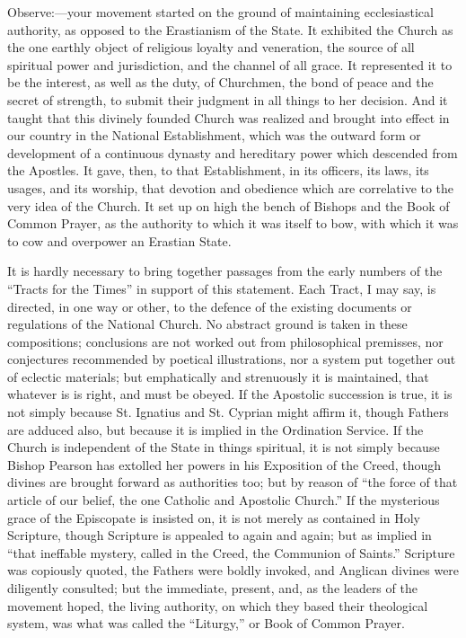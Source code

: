 Observe:—your movement started on the ground of maintaining
ecclesiastical authority, as opposed to the Erastianism of the State.
It exhibited the Church as the one earthly object of religious loyalty
and veneration, the source of all spiritual power and jurisdiction,
and the channel of all grace. It represented it to be the interest, as
well as the duty, of Churchmen, the bond of peace and the secret of
strength, to submit their judgment in all things to her decision. And
it taught that this divinely founded Church was realized and brought
into effect in our country in the National Establishment, which was
the outward form or development of a continuous dynasty and hereditary
power which descended from the Apostles. It gave, then, to that
Establishment, in its officers, its laws, its usages, and its worship,
that devotion and obedience which are correlative to the very idea of
the Church. It set up on high the bench of Bishops and the Book of
Common Prayer, as the authority to which it was itself to bow, with
which it was to cow and overpower an Erastian State.

It is hardly necessary to bring together passages from the early
numbers of the ``Tracts for the Times'' in support of this
statement. Each Tract, I may say, is directed, in one way or other, to
the defence of the existing documents or regulations of the National
Church. No abstract ground is taken in these compositions; conclusions
are not worked out from philosophical premisses, nor conjectures
recommended by poetical illustrations, nor a system put together out
of eclectic materials; but emphatically and strenuously it is
maintained, that whatever is is right, and must be obeyed. If the
Apostolic succession is true, it is not simply because St. Ignatius
and St. Cyprian might affirm it, though Fathers are adduced also, but
because it is implied in the Ordination Service. If the Church is
independent of the State in things spiritual, it is not simply because
Bishop Pearson has extolled her powers in his Exposition of the Creed,
though divines are brought forward as authorities too; but by reason
of ``the force of that article of our belief, the one Catholic and
Apostolic Church.'' If the mysterious grace of the Episcopate is
insisted on, it is not merely as contained in Holy Scripture, though
Scripture is appealed to again and again; but as implied in ``that
ineffable mystery, called in the Creed, the Communion of Saints.''
Scripture was copiously quoted, the Fathers were boldly invoked, and
Anglican divines were diligently consulted; but the immediate,
present, and, as the leaders of the movement hoped, the living
authority, on which they based their theological system, was what was
called the ``Liturgy,'' or Book of Common Prayer.

